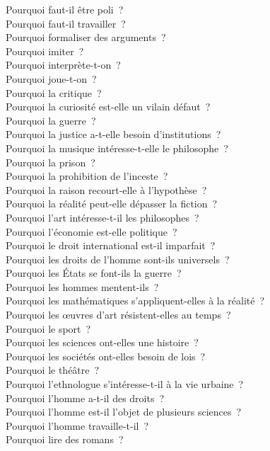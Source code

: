 \documentclass[a4paper,12pt]{article}
\begin{document}
Pourquoi faut-il être poli ? \\
Pourquoi faut-il travailler ? \\
Pourquoi formaliser des arguments ? \\
Pourquoi imiter ? \\
Pourquoi interprète-t-on ? \\
Pourquoi joue-t-on ? \\
Pourquoi la critique ? \\
Pourquoi la curiosité est-elle un vilain défaut ? \\
Pourquoi la guerre ? \\
Pourquoi la justice a-t-elle besoin d'institutions ? \\
Pourquoi la musique intéresse-t-elle le philosophe ? \\
Pourquoi la prison ? \\
Pourquoi la prohibition de l'inceste ? \\
Pourquoi la raison recourt-elle à l'hypothèse ? \\
Pourquoi la réalité peut-elle dépasser la fiction ? \\
Pourquoi l'art intéresse-t-il les philosophes ? \\
Pourquoi l'économie est-elle politique ? \\
Pourquoi le droit international est-il imparfait ? \\
Pourquoi les droits de l'homme sont-ils universels ? \\
Pourquoi les États se font-ils la guerre ? \\
Pourquoi les hommes mentent-ils ? \\
Pourquoi les mathématiques s'appliquent-elles à la réalité ? \\
Pourquoi les œuvres d'art résistent-elles au temps ? \\
Pourquoi le sport ? \\
Pourquoi les sciences ont-elles une histoire ? \\
Pourquoi les sociétés ont-elles besoin de lois ? \\
Pourquoi le théâtre ? \\
Pourquoi l'ethnologue s'intéresse-t-il à la vie urbaine ? \\
Pourquoi l'homme a-t-il des droits ? \\
Pourquoi l'homme est-il l'objet de plusieurs sciences ? \\
Pourquoi l'homme travaille-t-il ? \\
Pourquoi lire des romans ? \\
\end{document}
